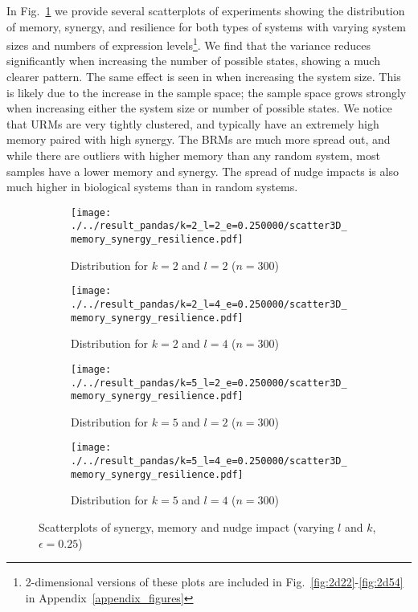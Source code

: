 \documentclass[../main.tex]{subfiles}
\begin{document}
In Fig.~\ref{fig:3dscatter} we provide several scatterplots of experiments showing the distribution of memory, synergy, and resilience for both types of systems with varying system sizes and numbers of expression levels\footnote{2-dimensional versions of these plots are included in Fig.~\ref{fig:2d22}-\ref{fig:2d54} in Appendix~\ref{appendix_figures}}.
We find that the variance reduces significantly when increasing the number of possible states, showing a much clearer pattern.
The same effect is seen in when increasing the system size.
This is likely due to the increase in the sample space; the sample space grows strongly when increasing either the system size or number of possible states.
We notice that URMs are very tightly clustered, and typically have an extremely high memory paired with high synergy.
The BRMs are much more spread out, and while there are outliers with higher memory than any random system, most samples have a lower memory and synergy.
The spread of nudge impacts is also much higher in biological systems than in random systems.

\begin{figure}[ht]
    \centering
    \begin{subfigure}[b]{0.48\textwidth}
        \texttt{[image: ./../result\_pandas/k=2\_l=2\_e=0.250000/scatter3D\_memory\_synergy\_resilience.pdf]}
        \caption{Distribution for $k=2$ and $l=2$ ($n=300$)}
    \end{subfigure}
    \begin{subfigure}[b]{0.48\textwidth}
        \texttt{[image: ./../result\_pandas/k=2\_l=4\_e=0.250000/scatter3D\_memory\_synergy\_resilience.pdf]}
        \caption{Distribution for $k=2$ and $l=4$ ($n=300$)}
    \end{subfigure}
\bigskip
    \begin{subfigure}[b]{0.48\textwidth}
        \texttt{[image: ./../result\_pandas/k=5\_l=2\_e=0.250000/scatter3D\_memory\_synergy\_resilience.pdf]}
        \caption{Distribution for $k=5$ and $l=2$ ($n=300$)}
    \end{subfigure}
    \begin{subfigure}[b]{0.48\textwidth}
        \texttt{[image: ./../result\_pandas/k=5\_l=4\_e=0.250000/scatter3D\_memory\_synergy\_resilience.pdf]}
        \caption{Distribution for $k=5$ and $l=4$ ($n=300$)}
    \end{subfigure}
    \caption{Scatterplots of synergy, memory and nudge impact (varying $l$ and $k$, $\epsilon = 0.25$)}
    \label{fig:3dscatter}
\end{figure}
\end{document}
